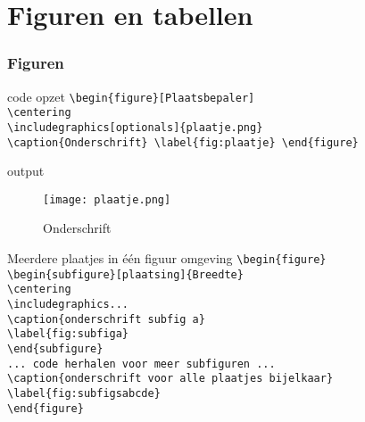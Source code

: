 \documentclass{beamer}
\begin{document}
\section{Figuren en tabellen}
\begin{frame}
	\frametitle{Figuren}
	\begin{block}{code opzet}
		\texttt{\textbackslash begin\{figure\}[Plaatsbepaler]\\
			\textbackslash centering\\
			\textbackslash includegraphics[optionals]\{plaatje.png\}\\
			\textbackslash caption\{Onderschrift\}
			\textbackslash label\{fig:plaatje\}
		\textbackslash end\{figure\}}
	\end{block}
	\begin{block}{output}
	{\begin{figure}
	\centering
	\texttt{[image: plaatje.png]}
	\caption{Onderschrift}
	\label{fig:plaatje}
	\end{figure}}
	\end{block}
\end{frame}
\begin{frame}{Meerdere plaatjes in \'e\'en figuur omgeving}
	\texttt{\textbackslash begin\{figure\}\\
		\quad	\textbackslash begin\{subfigure\}[plaatsing]\{Breedte\}\\
			\qquad	\textbackslash centering\\
			\qquad	\textbackslash includegraphics...\\
			\qquad	\textbackslash caption\{onderschrift subfig a\}\\
			\qquad	\textbackslash label\{fig:subfiga\}\\
		\quad	\textbackslash end\{subfigure\}\\
		\quad	... code herhalen voor meer subfiguren ...\\
		\quad	\textbackslash caption\{onderschrift voor alle plaatjes bijelkaar\}\\
		\quad	\textbackslash label\{fig:subfigsabcde\}\\
		\textbackslash end\{figure\}
	}
\end{frame}
\end{document}
